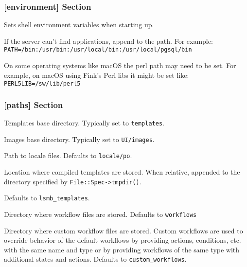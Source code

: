 \subsubsection{[environment] Section}
\label{subsubsec-global-config-ledgersmb-conf-environment}

	Sets shell environment variables when starting up.

\begin{description}[style=nextline]
	\item[PATH] If the server can't find applications, append to the path. For example:
	\texttt{PATH=/bin:/usr/bin:/usr/local/bin:/usr/local/pgsql/bin}
	\item [PERL5LIB] On some operating systems like macOS the perl path may need to be set. For example, on macOS using Fink's Perl libs it might be set like:
	\texttt{PERL5LIB=/sw/lib/perl5}
\end{description}


\subsubsection{[paths] Section}
\label{subsubsec-global-config-ledgersmb-conf-paths}

\begin{description}[style=nextline]
	\item [templates] Templates base directory. Typically set to \texttt{templates}.
	\item [images] Images base directory. Typically set to \texttt{UI/images}.
	\item [localepath] Path to locale files. Defaults to \texttt{locale/po}.
	\item [templates\_cache] Location where compiled templates are stored. When relative, appended to the directory specified by \texttt{File::Spec->tmpdir()}. 
	
	Defaults to \texttt{lsmb\_templates}.
	\item [workflows] Directory where workflow files are stored. Defaults to \texttt{workflows}
	\item [custom\_workflows] Directory where custom workflow files are stored. Custom workflows are used to override behavior of the default workflows by providing actions, conditions, etc. with the same name and type or by providing workflows of the same type with additional states and actions. Defaults to \texttt{custom\_workflows}.
	
\end{description}

